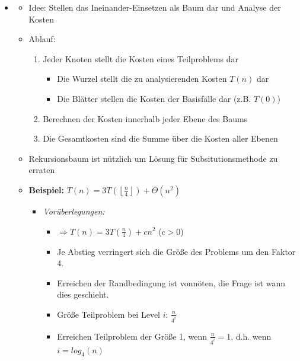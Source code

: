 \documentclass[
    12pt,
    a4paper,
    ngerman,
    color=3b,%
    marginpar=false,
    colorback=false,
    leqno,
]{tudaexercise}
\begin{document}
\begin{itemize}
    \item {}
          \begin{itemize}
              \item Idee: Stellen das Ineinander-Einsetzen als Baum dar und Analyse der Kosten
              \item Ablauf:
                    \begin{enumerate}
                        \item Jeder Knoten stellt die Kosten eines Teilproblems dar
                              \begin{itemize}
                                  \item Die Wurzel stellt die zu analysierenden Kosten $T(n)$ dar
                                  \item Die Blätter stellen die Kosten der Basisfälle dar (z.B. $T(0)$)
                              \end{itemize}
                        \item Berechnen der Kosten innerhalb jeder Ebene des Baums
                        \item Die Gesamtkosten sind die Summe über die Kosten aller Ebenen
                    \end{enumerate}
              \item Rekursionsbaum ist nützlich um Lösung für Subsitutionsmethode zu erraten
                    \clearpage
              \item \textbf{Beispiel:} $T(n) = 3T(\left \lfloor \frac{n}{4} \right \rfloor) + \Theta(n^2)$
                    \begin{itemize}
                        \item \textit{Vorüberlegungen:}
                              \begin{itemize}
                                  \item $\Rightarrow T(n) = 3T(\frac{n}{4}) + cn^2$ ($c>0$)
                                  \item Je Abstieg verringert sich die Größe des Problems um den Faktor 4.
                                  \item Erreichen der Randbedingung ist vonnöten, die Frage ist wann dies geschieht.
                                  \item Größe Teilproblem bei Level $i$: $\frac{n}{4^i}$
                                  \item Erreichen Teilproblem der Größe 1, wenn $\frac{n}{4^i}=1$, d.h. wenn $i=log_4(n)$ \\

\end{itemize}
\end{itemize}
\end{itemize}
\end{itemize}
\end{document}
